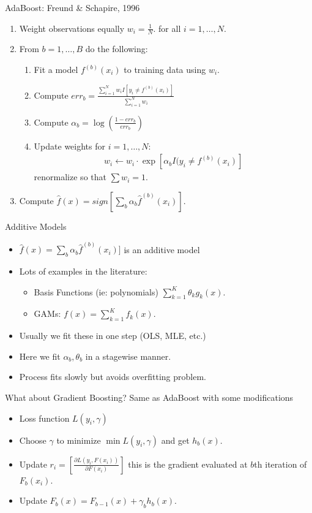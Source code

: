 \documentclass[xcolor=pdftex,dvipsnames,table,mathserif,aspectratio=169]{beamer}
\begin{document}
\begin{frame}{ AdaBoost: Freund \& Schapire, 1996}
\begin{enumerate}
\item Weight observations equally $w_i = \frac{1}{N}$. for all $i=1,\ldots,N$.
\item From $b=1,\ldots, B$ do the following:
\begin{enumerate}
\item Fit a model  $f^{(b)}(x_i)$ to training data using $w_i$.
\item Compute $err_b = \frac{\sum_{i=1}^N w_i I[ y_i \neq f^{(b)}(x_i) ]}{\sum_{i=1}^N w_i}$
\item Compute $\alpha_b = \log \left(  \frac{1-err_b}{err_b}\right)$
\item Update weights for $i=1,\ldots,N$: 
\begin{align*}
w_i \leftarrow w_i \cdot \exp[\alpha_b I (y_i \neq f^{(b)}(x_i) ]
\end{align*}
renormalize so that $\sum w_i =1$.
\end{enumerate}
\item Compute $\hat{f}(x) = sign[ \sum_{b} \alpha_b \hat{f}^{(b)}(x_i)]$.
\end{enumerate}
\end{frame}


\begin{frame}{Additive Models}
\begin{itemize}
\item $\hat{f}(x) = \sum_{b} \alpha_b \hat{f}^{(b)}(x_i)]$ is an \alert{additive model}
\item Lots of examples in the literature:
\begin{itemize}
\item  Basis Functions (ie: polynomials) $\sum_{k=1}^K \theta_k g_k(x)$.
\item GAMs: $f(x) = \sum_{k=1}^K f_k(x)$.
\end{itemize}
\item Usually we fit these in \alert{one step} (OLS, MLE, etc.)
\item Here we fit $\alpha_b, \theta_b$ in a \alert{stagewise} manner.
\item Process fits slowly but avoids overfitting problem.
\end{itemize}
\end{frame}




\begin{frame}{What about Gradient Boosting?}
Same as AdaBoost with some modifications
\begin{itemize}
\item Loss function $L(y_i,\gamma)$
\item Choose $\gamma$ to minimize $\min L(y_i,\gamma)$ and get $h_b(x)$.
\item Update $r_i = \left[ \frac{\partial L(y_i, F(x_i))}{ \partial F(x_i)} \right]$ this is the \alert{gradient} evaluated at $b$th iteration of $F_b(x_i)$.
\item Update $F_b(x) = F_{b-1}(x) + \gamma_b h_b(x)$.
\end{itemize}
\end{frame}
\end{document}
